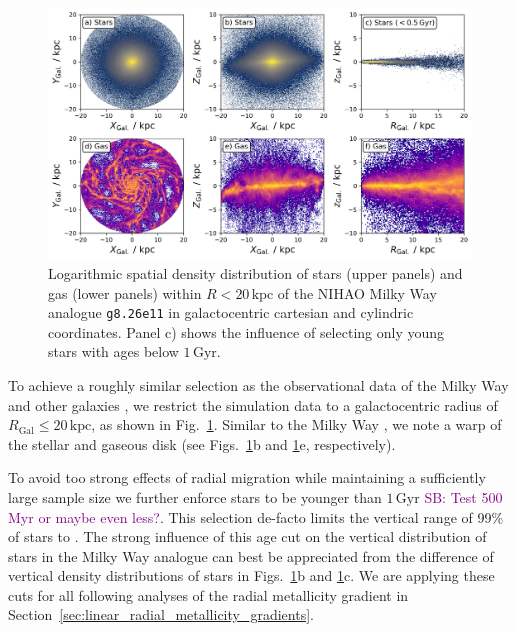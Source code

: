 \documentclass[fleqn,usenatbib]{mnras}
\newcommand{\SB}[1]{{\textcolor{purple}{SB: #1}}}
\begin{document}
\begin{figure}
    \centering
    \includegraphics[width=\textwidth]{figures/stars_and_gas_overview.png}
    \caption{Logarithmic spatial density distribution of stars (upper panels) and gas (lower panels) within $R < 20\,\mathrm{kpc}$ of the NIHAO Milky Way analogue \texttt{g8.26e11} in galactocentric cartesian and cylindric coordinates. Panel c) shows the influence of selecting only young stars with ages below $1\,\mathrm{Gyr}$.}
    \label{fig:stars_and_gas_overview}
\end{figure}

To achieve a roughly similar selection as the observational data of the Milky Way \citep{Genovali2014} and other galaxies \citep[e.g.][]{Chen2023}, we restrict the simulation data to a galactocentric radius of $R_\mathrm{Gal} \leq 20\,\mathrm{kpc}$, as shown in Fig.~\ref{fig:stars_and_gas_overview}. Similar to the Milky Way \citep{Poggio2018, Lemasle2022}, we note a warp of the stellar and gaseous disk (see Figs.~\ref{fig:stars_and_gas_overview}b and \ref{fig:stars_and_gas_overview}e, respectively).

To avoid too strong effects of radial migration \citep{Binney2008, Frankel2018, Grand2016} while maintaining a sufficiently large sample size we further enforce stars to be younger than $1\,\mathrm{Gyr}$ \SB{Test 500 Myr or maybe even less?}. This selection de-facto limits the vertical range of 99\% of stars to . The strong influence of this age cut on the vertical distribution of stars in the Milky Way analogue can best be appreciated from the difference of vertical density distributions of stars in Figs.~\ref{fig:stars_and_gas_overview}b and \ref{fig:stars_and_gas_overview}c. We are applying these cuts for all following analyses of the radial metallicity gradient in Section~\ref{sec:linear_radial_metallicity_gradients}.
\end{document}
